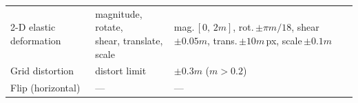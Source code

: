 \documentclass[review,12pt]{elsarticle}
\begin{document}
\begin{table}
\begin{tabular}{@{}lll@{}}
2-D elastic deformation & \parbox[t]{3.2cm}{magnitude, rotate,\\shear, translate, scale} & \parbox[t]{7.5cm}{mag.\,$[0,\,2m]$,\; rot.\,$\pm\pi m/18$,\; shear\,$\pm 0.05m$,\\trans.\,$\pm 10m$\,px,\; scale\,$\pm 0.1m$} \\[4pt]
Grid distortion         & distort limit              & $\pm 0.3m$ \quad ($m>0.2$) \\
Flip (horizontal)       & ---                        & --- \\
\bottomrule
\end{tabular}
\end{table}
\end{document}
